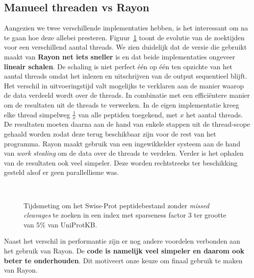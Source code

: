 \subsection{Manueel threaden vs Rayon}\label{subsec:manueel-threaden-vs-rayon}
Aangezien we twee verschillende implementaties hebben, is het interessant om na te gaan hoe deze allebei presteren.
Figuur~\ref{fig:threading_default_vs_rayon} toont de evolutie van de zoektijden voor een verschillend aantal threads.
We zien duidelijk dat de versie die gebruikt maakt van \textbf{Rayon net iets sneller} is en dat beide implementaties ongeveer \textbf{lineair schalen}.
De schaling is niet perfect één op één ten opzichte van het aantal threads omdat het inlezen en uitschrijven van de output sequentieel blijft.
Het verschil in uitvoeringstijd valt mogelijks te verklaren aan de manier waarop de data verdeeld wordt over de threads.
In combinatie met een efficiëntere manier om de resultaten uit de threads te verwerken.
In de eigen implementatie kreeg elke thread simpelweg $\frac{1}{x}$ van alle peptiden toegekend, met $x$ het aantal threads.
De resultaten moeten daarna aan de hand van enkele stappen uit de thread-scope gehaald worden zodat deze terug beschikbaar zijn voor de rest van het programma.
Rayon maakt gebruik van een ingewikkelder systeem aan de hand van \textit{work stealing}\cite{rayon_stealing} om de data over de threads te verdelen.
Verder is het ophalen van de resultaten ook veel simpeler.
Deze worden rechtstreeks ter beschikking gesteld alsof er geen parallellisme was.

\begin{figure}[H]
    \centering
    \\[4ex] %

    \caption{Tijdsmeting om het Swiss-Prot peptidebestand zonder \textit{missed cleavages} te zoeken in een index met sparseness factor 3 ter grootte van 5\% van UniProtKB.}\label{fig:threading_default_vs_rayon}
\end{figure}

Naast het verschil in performantie zijn er nog andere voordelen verbonden aan het gebruik van Rayon.
De \textbf{code is namelijk veel simpeler en daarom ook beter te onderhouden}.
Dit motiveert onze keuze om finaal gebruik te maken van Rayon.

